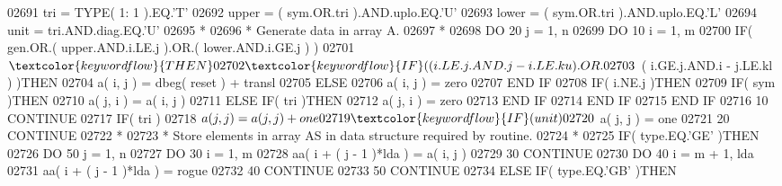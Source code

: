 \begin{DoxyCode}
02691       tri = \textcolor{keywordtype}{TYPE}( 1: 1 ).EQ.\textcolor{stringliteral}{'T'}
02692       upper = ( sym.OR.tri ).AND.uplo.EQ.\textcolor{stringliteral}{'U'}
02693       lower = ( sym.OR.tri ).AND.uplo.EQ.\textcolor{stringliteral}{'L'}
02694       unit = tri.AND.diag.EQ.\textcolor{stringliteral}{'U'}
02695 \textcolor{comment}{*}
02696 \textcolor{comment}{*     Generate data in array A.}
02697 \textcolor{comment}{*}
02698       \textcolor{keywordflow}{DO} 20 j = 1, n
02699          \textcolor{keywordflow}{DO} 10 i = 1, m
02700             \textcolor{keywordflow}{IF}( gen.OR.( upper.AND.i.LE.j ).OR.( lower.AND.i.GE.j ) )
02701      $          \textcolor{keywordflow}{THEN}
02702                \textcolor{keywordflow}{IF}( ( i.LE.j.AND.j - i.LE.ku ).OR.
02703      $             ( i.GE.j.AND.i - j.LE.kl ) )\textcolor{keywordflow}{THEN}
02704                   a( i, j ) = dbeg( reset ) + transl
02705                \textcolor{keywordflow}{ELSE}
02706                   a( i, j ) = zero
02707 \textcolor{keywordflow}{               END IF}
02708                \textcolor{keywordflow}{IF}( i.NE.j )\textcolor{keywordflow}{THEN}
02709                   \textcolor{keywordflow}{IF}( sym )\textcolor{keywordflow}{THEN}
02710                      a( j, i ) = a( i, j )
02711                   \textcolor{keywordflow}{ELSE} \textcolor{keywordflow}{IF}( tri )\textcolor{keywordflow}{THEN}
02712                      a( j, i ) = zero
02713 \textcolor{keywordflow}{                  END IF}
02714 \textcolor{keywordflow}{               END IF}
02715 \textcolor{keywordflow}{            END IF}
02716    10    \textcolor{keywordflow}{CONTINUE}
02717          \textcolor{keywordflow}{IF}( tri )
02718      $      a( j, j ) = a( j, j ) + one
02719          \textcolor{keywordflow}{IF}( unit )
02720      $      a( j, j ) = one
02721    20 \textcolor{keywordflow}{CONTINUE}
02722 \textcolor{comment}{*}
02723 \textcolor{comment}{*     Store elements in array AS in data structure required by routine.}
02724 \textcolor{comment}{*}
02725       \textcolor{keywordflow}{IF}( type.EQ.\textcolor{stringliteral}{'GE'} )\textcolor{keywordflow}{THEN}
02726          \textcolor{keywordflow}{DO} 50 j = 1, n
02727             \textcolor{keywordflow}{DO} 30 i = 1, m
02728                aa( i + ( j - 1 )*lda ) = a( i, j )
02729    30       \textcolor{keywordflow}{CONTINUE}
02730             \textcolor{keywordflow}{DO} 40 i = m + 1, lda
02731                aa( i + ( j - 1 )*lda ) = rogue
02732    40       \textcolor{keywordflow}{CONTINUE}
02733    50    \textcolor{keywordflow}{CONTINUE}
02734       \textcolor{keywordflow}{ELSE} \textcolor{keywordflow}{IF}( type.EQ.\textcolor{stringliteral}{'GB'} )\textcolor{keywordflow}{THEN}

\end{DoxyCode}
